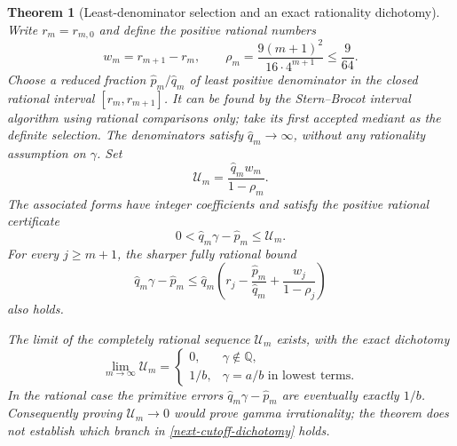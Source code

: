 \documentclass[11pt,a4paper]{article}
\newtheorem{theorem}{Theorem}[section]
\theoremstyle{definition}
\theoremstyle{remark}
\begin{document}
\begin{theorem}[Least-denominator selection and an exact rationality dichotomy]
\label{next-cutoff-selection}
Write $r_m=r_{m,0}$ and define the positive rational numbers
\[
 w_m=r_{m+1}-r_m,\qquad
 \rho_m=\frac{9(m+1)^2}{16\cdot4^{m+1}}\le\frac9{64}.
\]
Choose a reduced fraction $\widehat p_m/\widehat q_m$ of least positive
denominator in the closed rational interval $[r_m,r_{m+1}]$.
It can be found by the Stern--Brocot interval algorithm using rational
comparisons only; take its first accepted mediant as the definite selection.
The denominators satisfy $\widehat q_m\to\infty$,
without any rationality assumption on $\gamma$. Set
\[
 \mathcal U_m=\frac{\widehat q_m w_m}{1-\rho_m}.
\]
The associated forms have integer coefficients and satisfy the positive
rational certificate
\begin{equation}\label{next-cutoff-selected-certificate}
 0<\widehat q_m\gamma-\widehat p_m\le\mathcal U_m.
\end{equation}
For every $j\ge m+1$, the sharper fully rational bound
\begin{equation}\label{next-cutoff-refined-certificate}
 \widehat q_m\gamma-\widehat p_m
 \le
 \widehat q_m\left(r_j-\frac{\widehat p_m}{\widehat q_m}
                   +\frac{w_j}{1-\rho_j}\right)
\end{equation}
also holds.

The limit of the completely rational sequence $\mathcal U_m$ exists,
with the exact dichotomy
\begin{equation}\label{next-cutoff-dichotomy}
 \lim_{m\to\infty}\mathcal U_m=
 \begin{cases}
  0,&\gamma\notin\mathbb Q,\\
  1/b,&\gamma=a/b\text{ in lowest terms}.
 \end{cases}
\end{equation}
In the rational case the primitive errors
$\widehat q_m\gamma-\widehat p_m$ are eventually exactly $1/b$.
Consequently proving $\mathcal U_m\to0$ would prove gamma irrationality;
the theorem does not establish which branch in
\eqref{next-cutoff-dichotomy} holds.
\end{theorem}
\end{document}
